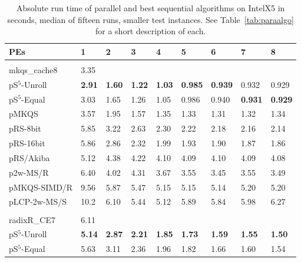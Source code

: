 \documentclass[a4paper]{myjournal}
\begin{document}
\begin{table}\centering\small
\caption{Absolute run time of parallel and best sequential algorithms on IntelX5 in seconds, median of fifteen runs, smaller test instances. See Table~\ref{tab:paraalgo} for a short description of each.}\label{tab:absrun-IntelX5b}
\begin{tabularx}{\linewidth}{l|*{8}{>{\hfill}X}|@{}}
PEs          & 1   & 2 & 3 & 4 & 5 & 6 & 7 & 8                                                                                      \\ \hline
& \multicolumn{8}{l|}{\textbf{Sinha URLs} (complete), $n = 10\,\text{M}$, $N = 304\,\text{Mi}$, $\frac{D}{N} = 97\,5\,\%$} \\ \cline{2-9}
mkqs\_cache8 & 3.35 &  &  &  &  &  &  &  \\
pS$^5$-Unroll & \bf 2.91 & \bf 1.60 & \bf 1.22 & \bf 1.03 & \bf 0.985 & \bf 0.939 &     0.932 &     0.929 \\
 pS$^5$-Equal &     3.03 &     1.65 &     1.26 &     1.05 &     0.986 &     0.940 & \bf 0.931 & \bf 0.929 \\
        pMKQS &     3.57 &     1.95 &     1.57 &     1.35 &      1.33 &      1.31 &      1.32 &      1.34 \\
     pRS-8bit &     5.85 &     3.22 &     2.63 &     2.30 &      2.22 &      2.18 &      2.16 &      2.14 \\
    pRS-16bit &     5.86 &     2.86 &     2.32 &     1.99 &      1.93 &      1.90 &      1.87 &      1.86 \\
    pRS/Akiba &     5.12 &     4.38 &     4.22 &     4.10 &      4.09 &      4.10 &      4.09 &      4.08 \\
     p2w-MS/R &     6.40 &     4.02 &     4.31 &     3.67 &      3.55 &      3.45 &      3.55 &      3.49 \\
 pMKQS-SIMD/R &     9.56 &     5.87 &     5.47 &     5.15 &      5.15 &      5.14 &      5.20 &      5.20 \\
 pLCP-2w-MS/S &     10.2 &     6.10 &     5.44 &     5.12 &      5.89 &      5.84 &      5.98 &      6.27 \\ \hline
& \multicolumn{8}{l|}{\textbf{Sinha DNA} (complete), $n = 31.6\,\text{M}$, $N = 302\,\text{Mi}$, $\frac{D}{N} = 100\,\%$} \\ \cline{2-9}
radixR\_CE7 & 6.11 &  &  &  &  &  &  &  \\
pS$^5$-Unroll & \bf 5.14 & \bf 2.87 & \bf 2.21 & \bf 1.85 & \bf 1.73 & \bf 1.59 & \bf 1.55 & \bf 1.50 \\
 pS$^5$-Equal &     5.63 &     3.11 &     2.36 &     1.96 &     1.82 &     1.66 &     1.60 &     1.54 \\

\end{tabularx}
\end{table}
\end{document}
